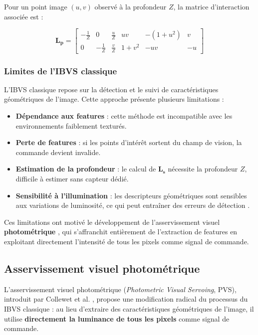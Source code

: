 Pour un point image $(u, v)$ observé à la profondeur $Z$, la matrice 
d'interaction associée est \cite{ref6} :

\begin{equation}
    \mathbf{L_p} = 
    \begin{bmatrix}
    -\frac{1}{Z} & 0 & \frac{u}{Z} & uv & -(1+u^2) & v \\
    0 & -\frac{1}{Z} & \frac{v}{Z} & 1+v^2 & -uv & -u
    \end{bmatrix}
    \label{eq:Lp}
\end{equation}

\subsubsection{Limites de l'IBVS classique}

L'IBVS classique repose sur la détection et le suivi de caractéristiques géométriques de l'image. Cette approche présente plusieurs limitations \cite{ref6, ref7} :

\begin{itemize}[noitemsep, topsep=4pt]
    \item \textbf{Dépendance aux features} : cette méthode est incompatible avec les environnements faiblement texturés.
    \item \textbf{Perte de features} : si les points d'intérêt sortent 
    du champ de vision, la commande devient invalide.
    \item \textbf{Estimation de la profondeur} : le calcul de 
    $\mathbf{L_s}$ nécessite la profondeur $Z$, difficile à estimer 
    sans capteur dédié.
    \item \textbf{Sensibilité à l'illumination} : les descripteurs 
    géométriques sont sensibles aux variations de luminosité, ce qui peut entraîner des erreurs de détection .
\end{itemize}

Ces limitations ont motivé le développement de l'asservissement visuel 
\textbf{photométrique} \cite{ref7}, qui s'affranchit entièrement de 
l'extraction de features en exploitant directement l'intensité de tous 
les pixels comme signal de commande.

\subsection{Asservissement visuel photométrique}



L'asservissement visuel photométrique (\textit{Photometric Visual Servoing}, PVS), introduit par Collewet et al. \cite{ref7}, propose une modification radical du processus du IBVS classique : au lieu d'extraire des caractéristiques géométriques de l'image, il utilise \textbf{directement la luminance de tous les pixels} comme signal de commande.

